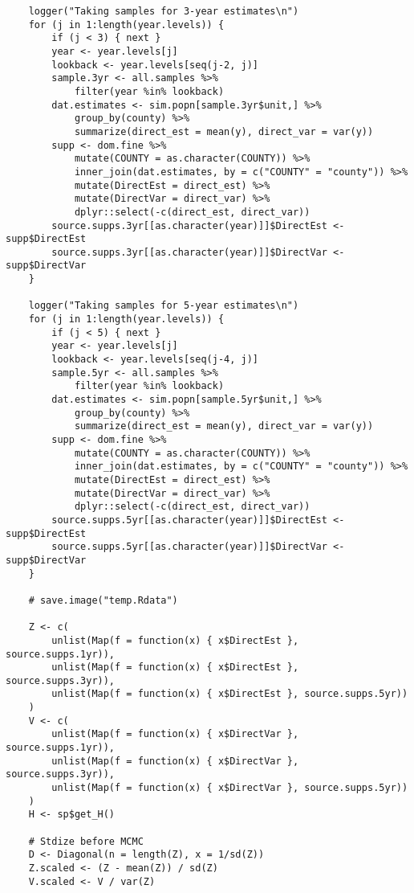 \documentclass[12pt]{article}
\begin{document}
\begin{footnotesize}
\begin{verbatim}
    logger("Taking samples for 3-year estimates\n")
    for (j in 1:length(year.levels)) {
        if (j < 3) { next }
        year <- year.levels[j]
        lookback <- year.levels[seq(j-2, j)]
        sample.3yr <- all.samples %>%
            filter(year %in% lookback)
        dat.estimates <- sim.popn[sample.3yr$unit,] %>%
            group_by(county) %>%
            summarize(direct_est = mean(y), direct_var = var(y))
        supp <- dom.fine %>%
            mutate(COUNTY = as.character(COUNTY)) %>%
            inner_join(dat.estimates, by = c("COUNTY" = "county")) %>%
            mutate(DirectEst = direct_est) %>%
            mutate(DirectVar = direct_var) %>%
            dplyr::select(-c(direct_est, direct_var))
        source.supps.3yr[[as.character(year)]]$DirectEst <- supp$DirectEst
        source.supps.3yr[[as.character(year)]]$DirectVar <- supp$DirectVar
    }

    logger("Taking samples for 5-year estimates\n")
    for (j in 1:length(year.levels)) {
        if (j < 5) { next }
        year <- year.levels[j]
        lookback <- year.levels[seq(j-4, j)]
        sample.5yr <- all.samples %>%
            filter(year %in% lookback)
        dat.estimates <- sim.popn[sample.5yr$unit,] %>%
            group_by(county) %>%
            summarize(direct_est = mean(y), direct_var = var(y))
        supp <- dom.fine %>%
            mutate(COUNTY = as.character(COUNTY)) %>%
            inner_join(dat.estimates, by = c("COUNTY" = "county")) %>%
            mutate(DirectEst = direct_est) %>%
            mutate(DirectVar = direct_var) %>%
            dplyr::select(-c(direct_est, direct_var))
        source.supps.5yr[[as.character(year)]]$DirectEst <- supp$DirectEst
        source.supps.5yr[[as.character(year)]]$DirectVar <- supp$DirectVar
    }

    # save.image("temp.Rdata")

    Z <- c(
        unlist(Map(f = function(x) { x$DirectEst }, source.supps.1yr)),
        unlist(Map(f = function(x) { x$DirectEst }, source.supps.3yr)),
        unlist(Map(f = function(x) { x$DirectEst }, source.supps.5yr))
    )
    V <- c(
        unlist(Map(f = function(x) { x$DirectVar }, source.supps.1yr)),
        unlist(Map(f = function(x) { x$DirectVar }, source.supps.3yr)),
        unlist(Map(f = function(x) { x$DirectVar }, source.supps.5yr))
    )
    H <- sp$get_H()

    # Stdize before MCMC
    D <- Diagonal(n = length(Z), x = 1/sd(Z))
    Z.scaled <- (Z - mean(Z)) / sd(Z)
    V.scaled <- V / var(Z)


\end{verbatim}
\end{footnotesize}
\end{document}
